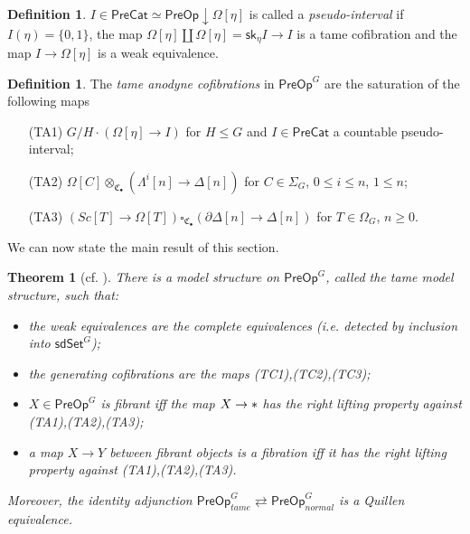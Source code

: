 \documentclass[a4paper,10pt]{article}%
\numberwithin{equation}{section}
\numberwithin{figure}{section}
\newtheorem{theorem}[equation]{Theorem}%
\theoremstyle{definition} %
\newtheorem{definition}[equation]{Definition}%
\newcommand{\1}{\ensuremath{\mathbbm 1}}%
\begin{document}
\begin{definition}\label{PSEUINT DEF}
	$I \in \mathsf{PreCat}\simeq \mathsf{PreOp} \downarrow \Omega[\eta]$ 
	is called a \emph{pseudo-interval}
	if $I(\eta) = \{0,1\}$,
	the map 
	$\Omega[\eta] \amalg \Omega[\eta]
	= \mathsf{sk}_{\eta} I \to I$
	is a tame cofibration and the map
	$I \to \Omega[\eta]$
	is a weak equivalence.
\end{definition}


\begin{definition}\label{TAMEGENANO DEF}
	The \emph{tame anodyne cofibrations} in $\mathsf{PreOp}^G$ 
	are the saturation of the following maps
	\begin{itemize}
		\item[(TA1)] $G/H \cdot 
		\left(\Omega[\eta] \to I \right)$ for $H \leq G$
		and $I \in \mathsf{PreCat}$
		a countable pseudo-interval;
		\item[(TA2)] $\Omega[C] \otimes_{\mathfrak{C}_{\bullet}} \left(\Lambda^i[n] \to \Delta[n]\right)$ for $C \in \Sigma_G$, $0 \leq i \leq n$, $1 \leq n$;
		\item[(TA3)] 
		$\left( Sc[T] \to \Omega[T] \right) 
		\square_{\mathfrak{C}_{\bullet}}
		\left(\partial \Delta[n] \to \Delta[n]\right)$ for $T \in \Omega_G$, $n \geq 0$.
	\end{itemize}
\end{definition}


We can now state the main result of this section.

\begin{theorem}[{cf. \cite[Thm. 7.19]{CM13b}}]
      \label{TAMEMS_THM}
	There is a model structure on 
	$\mathsf{PreOp}^G$,
	called the \emph{tame model structure},
	such that:
	\begin{itemize}
		\item the weak equivalences are the complete equivalences (i.e. detected by inclusion into 
		$\mathsf{sdSet}^G$);
		\item the generating cofibrations are the maps (TC1),(TC2),(TC3);
		\item $X \in \mathsf{PreOp}^G$ is fibrant iff
		the map $X \to \**$ has the right lifting property against 
		(TA1),(TA2),(TA3);
		\item a map $X \to Y$ between fibrant objects is a fibration iff
		it has the right lifting property against 
		(TA1),(TA2),(TA3).
	\end{itemize}
	Moreover, the identity adjunction
	$
	\mathsf{PreOp}^G_{tame} 
	\rightleftarrows
	\mathsf{PreOp}^G_{normal} 
	$
	is a Quillen equivalence.
\end{theorem}
\end{document}
